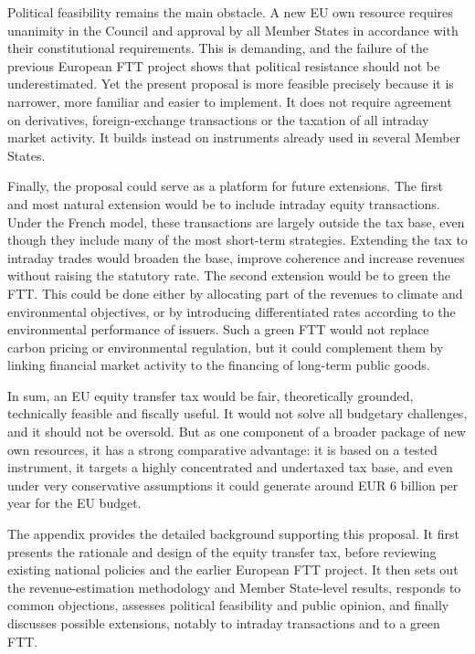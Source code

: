 \documentclass[../../main]{subfiles}
\begin{document}
Political feasibility remains the main obstacle. A new EU own resource requires unanimity in the Council and approval by all Member States in accordance with their constitutional requirements. This is demanding, and the failure of the previous European FTT project shows that political resistance should not be underestimated. Yet the present proposal is more feasible precisely because it is narrower, more familiar and easier to implement. It does not require agreement on derivatives, foreign-exchange transactions or the taxation of all intraday market activity. It builds instead on instruments already used in several Member States.

Finally, the proposal could serve as a platform for future extensions. The first and most natural extension would be to include intraday equity transactions. Under the French model, these transactions are largely outside the tax base, even though they include many of the most short-term strategies. Extending the tax to intraday trades would broaden the base, improve coherence and increase revenues without raising the statutory rate. The second extension would be to green the FTT. This could be done either by allocating part of the revenues to climate and environmental objectives, or by introducing differentiated rates according to the environmental performance of issuers. Such a green FTT would not replace carbon pricing or environmental regulation, but it could complement them by linking financial market activity to the financing of long-term public goods.

In sum, an EU equity transfer tax would be fair, theoretically grounded, technically feasible and fiscally useful. It would not solve all budgetary challenges, and it should not be oversold. But as one component of a broader package of new own resources, it has a strong comparative advantage: it is based on a tested instrument, it targets a highly concentrated and undertaxed tax base, and even under very conservative assumptions it could generate around EUR 6 billion per year for the EU budget.

The appendix provides the detailed background supporting this proposal. It first presents the rationale and design of the equity transfer tax, before reviewing existing national policies and the earlier European FTT project. It then sets out the revenue-estimation methodology and Member State-level results, responds to common objections, assesses political feasibility and public opinion, and finally discusses possible extensions, notably to intraday transactions and to a green FTT.
\end{document}
